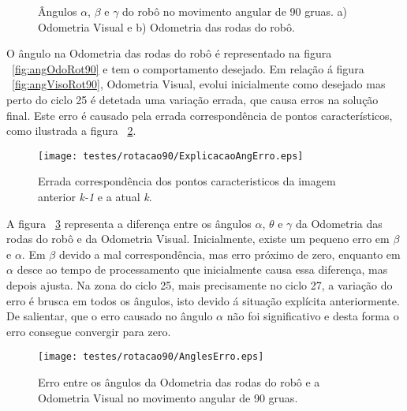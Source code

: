 \begin{figure}[h!]
	\centering
	\qquad
	\caption{Ângulos $\alpha$, $\beta$ e $\gamma$ do robô  no movimento angular de 90 gruas. a) Odometria Visual e b) Odometria das rodas do robô.}
	\label{fig:angRot90}
\end{figure}


O ângulo na Odometria das rodas do robô é representado na figura ~\ref{fig:angOdoRot90} e tem o comportamento desejado. Em relação á figura ~\ref{fig:angVisoRot90}, Odometria Visual, evolui inicialmente como desejado mas perto do ciclo 25 é detetada uma variação errada, que causa erros na solução final. Este erro é causado pela errada correspondência de pontos característicos, como ilustrada a figura ~\ref{fig:ExplicAngErr}. 


\begin{figure}[h!]
	\begin{center}
		\leavevmode		
		\texttt{[image: testes/rotacao90/ExplicacaoAngErro.eps]}
		\caption{Errada correspondência dos pontos caracteristicos da imagem anterior \textit{k-1} e a atual \textit{k}.}
		\label{fig:ExplicAngErr}
	\end{center}
\end{figure}


A figura ~\ref{fig:AnglesErro} representa a diferença entre os ângulos $\alpha$, $\theta$ e $\gamma$ da Odometria das rodas do robô e da Odometria Visual. Inicialmente, existe um pequeno erro em $\beta$ e $\alpha$. Em $\beta$ devido a mal correspondência, mas erro próximo de zero, enquanto em $\alpha$ desce ao tempo de processamento que inicialmente causa essa diferença, mas depois ajusta. Na zona do ciclo 25, mais precisamente no ciclo 27, a variação do erro é brusca em todos os ângulos, isto devido á situação explícita anteriormente. De salientar, que o erro causado no ângulo $\alpha$ não foi significativo e desta forma o erro consegue convergir para zero.



\begin{figure}[h!]
	\begin{center}
		\leavevmode		
		\texttt{[image: testes/rotacao90/AnglesErro.eps]}
		\caption{Erro entre os ângulos da Odometria das rodas do robô e a Odometria Visual no movimento angular de 90 gruas.}
		\label{fig:AnglesErro}
	\end{center}
\end{figure}



